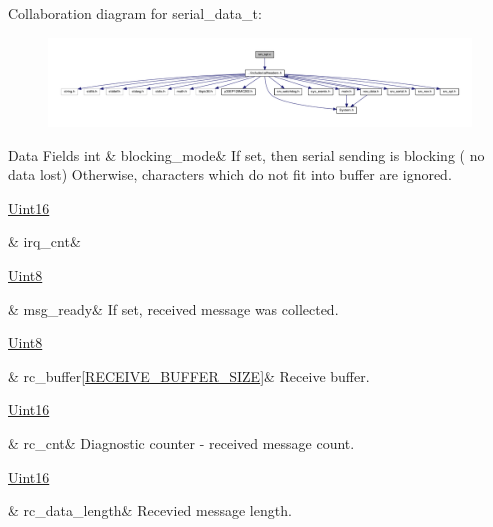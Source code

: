 Collaboration diagram for serial\+\_\+data\+\_\+t\+:\nopagebreak
\begin{figure}[H]
\begin{center}
\leavevmode
\includegraphics[width=350pt]{d6/d01/a01690}
\end{center}
\end{figure}
\begin{DoxyFields}{Data Fields}
\hypertarget{a00030_a758ac775caab1899af08024d4635f7e3}{int}\label{a00030_a758ac775caab1899af08024d4635f7e3}
&
blocking\+\_\+mode&
If set, then serial sending is blocking ( no data lost) Otherwise, characters which do not fit into buffer are ignored. \\
\hline

\hypertarget{a00030_a15d632931355763426453b626cab774b}{\hyperlink{a00072_a59a9f6be4562c327cbfb4f7e8e18f08b}{Uint16}}\label{a00030_a15d632931355763426453b626cab774b}
&
irq\+\_\+cnt&
\\
\hline

\hypertarget{a00030_ac0789a6c9ab7ccd13d6f04ae31496854}{\hyperlink{a00072_af84840501dec18061d18a68c162a8fa2}{Uint8}}\label{a00030_ac0789a6c9ab7ccd13d6f04ae31496854}
&
msg\+\_\+ready&
If set, received message was collected. \\
\hline

\hypertarget{a00030_ac734cb8be27f86bd99edc539434883a4}{\hyperlink{a00072_af84840501dec18061d18a68c162a8fa2}{Uint8}}\label{a00030_ac734cb8be27f86bd99edc539434883a4}
&
rc\+\_\+buffer\mbox{[}\hyperlink{a00031_aa49ab378520c95fea987f93a7f3c9abf}{R\+E\+C\+E\+I\+V\+E\+\_\+\+B\+U\+F\+F\+E\+R\+\_\+\+S\+I\+Z\+E}\mbox{]}&
Receive buffer. \\
\hline

\hypertarget{a00030_a51eacf0fe4dbe4cfbdaf0aaa63693013}{\hyperlink{a00072_a59a9f6be4562c327cbfb4f7e8e18f08b}{Uint16}}\label{a00030_a51eacf0fe4dbe4cfbdaf0aaa63693013}
&
rc\+\_\+cnt&
Diagnostic counter -\/ received message count. \\
\hline

\hypertarget{a00030_ab136d4fef2c523afd55b6ca74c46d7cc}{\hyperlink{a00072_a59a9f6be4562c327cbfb4f7e8e18f08b}{Uint16}}\label{a00030_ab136d4fef2c523afd55b6ca74c46d7cc}
&
rc\+\_\+data\+\_\+length&
Recevied message length. \\
\hline


\end{DoxyFields}
